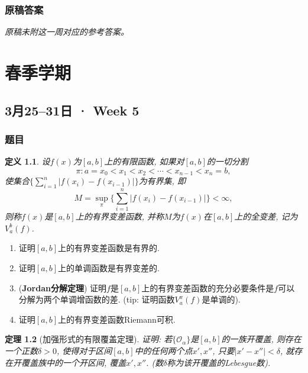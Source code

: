\documentclass[UTF8,11pt, a4paper, oneside, fontset=none]{ctexbook}
\newtheorem{theorem}{定理}[chapter]
\newtheorem{definition}[theorem]{定义}
\begin{document}
\clearpage

\subsection*{原稿答案}

\noindent\emph{原稿未附这一周对应的参考答案。}

\clearpage

\chapter{春季学期}

\clearpage

\section{3月25--31日 · Week 5}

\subsection*{题目}

\begin{definition}
设$f(x)$为$[a, b]$上的有限函数, 如果对$[a, b]$的一切分割
\[
\pi: a = x_0  < x_1 < x_2 < \cdots < x_{n-1} < x_n =b,
\]
使集合$\{ \sum_{i=1}^n |f(x_i) - f(x_{i-1})| \}$为有界集, 即
\[
M = \sup_{\pi}\{ \sum_{i=1}^n |f(x_i) - f(x_{i-1})| \} < \infty,
\]
则称$f(x)$是$[a, b]$上的有界变差函数, 并称$M$为$f(x)$在$[a, b]$上的全变差, 记为$V_a^b(f)$.
\end{definition}

\begin{enumerate}
\item 证明$[a, b]$上的有界变差函数是有界的.
\item 证明$[a, b]$上的单调函数是有界变差的.
\item ({\bf Jordan分解定理}) 证明$f$是$[a, b]$上的有界变差函数的充分必要条件是$f$可以分解为两个单调增函数的差. (tip: 证明函数$V_a^x(f)$是单调的).
\item 证明$[a, b]$上的有界变差函数Riemann可积.
\end{enumerate}

\begin{theorem}[加强形式的有限覆盖定理]
证明: 若$\{ \mathcal O_{\alpha} \}$是$[a, b]$的一族开覆盖, 则存在一个正数$\delta >0$, 使得对于区间$[a, b]$中的任何两个点$x', x''$, 只要$|x' - x''|< \delta$, 就存在开覆盖族中的一个开区间, 覆盖$x', x''$. (数$\delta$称为该开覆盖的Lebesgue数).
\end{theorem}
\end{document}
